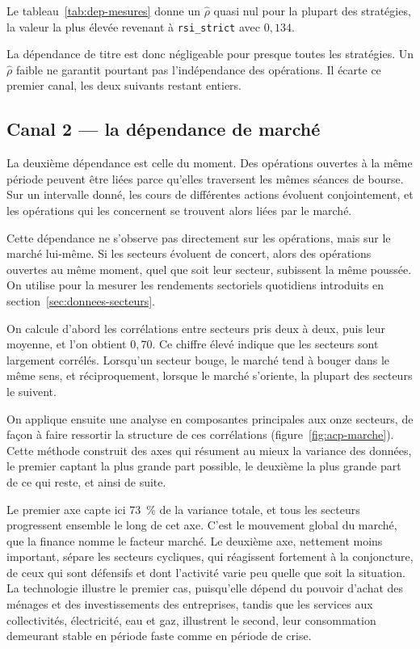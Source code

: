 Le tableau~\ref{tab:dep-mesures} donne un $\hat\rho$ quasi nul pour la
plupart des stratégies, la valeur la plus élevée revenant à
\texttt{rsi\_strict} avec $0{,}134$.

La dépendance de titre est donc négligeable pour presque toutes les
stratégies. Un $\hat\rho$ faible ne garantit pourtant pas l'indépendance des
opérations. Il écarte ce premier canal, les deux suivants restant entiers.

\subsection{Canal 2 --- la dépendance de marché}
\label{sec:dep-canal2}

La deuxième dépendance est celle du moment. Des opérations ouvertes à la même
période peuvent être liées parce qu'elles traversent les mêmes séances de
bourse. Sur un intervalle donné, les cours de différentes actions évoluent
conjointement, et les opérations qui les concernent se trouvent alors liées
par le marché.

Cette dépendance ne s'observe pas directement sur les opérations, mais sur le
marché lui-même. Si les secteurs évoluent de concert, alors des opérations
ouvertes au même moment, quel que soit leur secteur, subissent la même
poussée. On utilise pour la mesurer les rendements sectoriels quotidiens
introduits en section~\ref{sec:donnees-secteurs}.

On calcule d'abord les corrélations entre secteurs pris deux à deux, puis
leur moyenne, et l'on obtient $0{,}70$. Ce chiffre élevé indique que les
secteurs sont largement corrélés. Lorsqu'un secteur bouge, le marché tend à
bouger dans le même sens, et réciproquement, lorsque le marché s'oriente, la
plupart des secteurs le suivent.

On applique ensuite une analyse en composantes principales aux onze secteurs,
de façon à faire ressortir la structure de ces corrélations
(figure~\ref{fig:acp-marche}). Cette méthode construit des axes qui résument
au mieux la variance des données, le premier captant la plus grande part
possible, le deuxième la plus grande part de ce qui reste, et ainsi de suite.

Le premier axe capte ici 73~\% de la variance totale, et tous les secteurs
progressent ensemble le long de cet axe. C'est le mouvement global du marché,
que la finance nomme le facteur marché. Le deuxième axe, nettement moins
important, sépare les secteurs cycliques, qui réagissent fortement à la
conjoncture, de ceux qui sont défensifs et dont l'activité varie peu quelle
que soit la situation. La technologie illustre le premier cas, puisqu'elle
dépend du pouvoir d'achat des ménages et des investissements des entreprises,
tandis que les services aux collectivités, électricité, eau et gaz,
illustrent le second, leur consommation demeurant stable en période faste
comme en période de crise.

